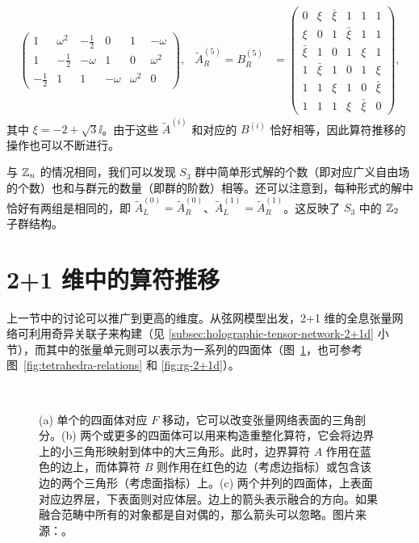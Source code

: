 \begin{align}
\begin{pmatrix}
    1 & \omega^2 & -\frac12 & 0 & 1 & -\omega \\
    1 & -\frac12 & -\omega & 1 & 0 & \omega^2 \\
    -\frac12 & 1 & 1 & -\omega & \omega^2 & 0
  \end{pmatrix}, &
  \tilde{A}^{(5)}_R = B^{(5)}_R &= \begin{pmatrix}
    0 & \xi & \bar{\xi} & 1 & 1 & 1 \\
    \xi & 0 & 1 & \bar{\xi} & 1 & 1 \\
    \bar{\xi} & 1 & 0 & 1 & \xi & 1 \\
    1 & \bar{\xi} & 1 & 0 & 1 & \xi \\
    1 & 1 & \xi & 1 & 0 & \bar{\xi} \\
    1 & 1 & 1 & \xi & \bar{\xi} & 0
  \end{pmatrix},
\end{align}
其中 $\xi=-2+\sqrt3\ii$。由于这些 $\tilde{A}^{(i)}$ 和对应的 $B^{(i)}$ 恰好相等，因此算符推移的操作也可以不断进行。
\endgroup

与 $\mathbb{Z}_n$ 的情况相同，我们可以发现 $S_3$ 群中简单形式解的个数（即对应广义自由场的个数）也和与群元的数量（即群的阶数）相等。还可以注意到，每种形式的解中恰好有两组是相同的，即 $\tilde{A}^{(0)}_L=\tilde{A}^{(0)}_R$、$\tilde{A}^{(1)}_L=\tilde{A}^{(1)}_R$。这反映了 $S_3$ 中的 $\mathbb{Z}_2$ 子群结构。

\section{2+1 维中的算符推移}

上一节中的讨论可以推广到更高的维度。从弦网模型出发，2+1 维的全息张量网络可利用奇异关联子来构建（见 \ref{subsec:holographic-tensor-network-2+1d} 小节），而其中的张量单元则可以表示为一系列的四面体（图~\ref{fig:rg-2+1d-tetrahedra}，也可参考图~\ref{fig:tetrahedra-relations} 和 \ref{fig:rg-2+1d}）。

\begin{figure}[htb]
  \centering
   \qquad
   \\[1ex]
  \caption[2+1 维全息张量网络中的四面体张量单元]{(a) 单个的四面体对应 $F$ 移动，它可以改变张量网络表面的三角剖分。(b) 两个或更多的四面体可以用来构造重整化算符，它会将边界上的小三角形映射到体中的大三角形。此时，边界算符 $A$ 作用在蓝色的边上，而体算符 $B$ 则作用在红色的边（考虑边指标）或包含该边的两个三角形（考虑面指标）上。(c) 两个并列的四面体，上表面对应边界层，下表面则对应体层。边上的箭头表示融合的方向。如果融合范畴中所有的对象都是自对偶的，那么箭头可以忽略。图片来源：\parencite{zeng2023bulk}。}
  \label{fig:rg-2+1d-tetrahedra}
\end{figure}

